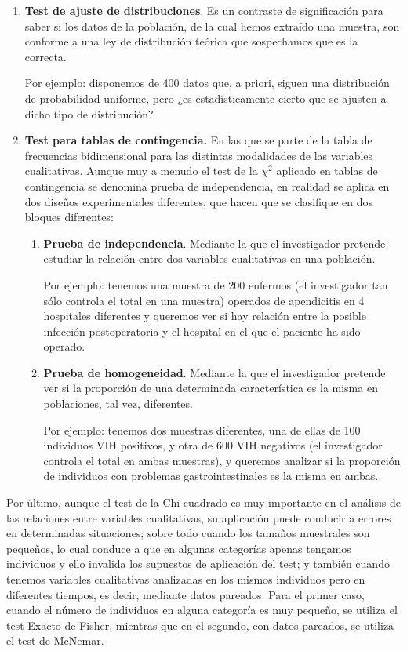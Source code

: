 \begin{enumerate}
\item \textbf{Test de ajuste de distribuciones}. Es un contraste
de significación para saber si los datos de la población, de la
cual hemos extraído una muestra, son conforme a una ley de
distribución teórica que sospechamos que es la correcta.

Por ejemplo: disponemos de 400 datos que, a priori, siguen una
distribución de probabilidad uniforme, pero ¿es estadísticamente
cierto que se ajusten a dicho tipo de distribución?


\item \textbf{Test para tablas de contingencia.} En las que se parte de la tabla de frecuencias bidimensional para las distintas modalidades de las variables cualitativas. Aunque muy a menudo el test de la
$\chi^{2}$ aplicado en tablas de contingencia se denomina prueba
de independencia, en realidad se aplica en dos diseños
experimentales diferentes, que hacen que se clasifique en dos
bloques diferentes:


\begin{enumerate}
\item \textbf{Prueba de independencia}. Mediante la que el
investigador pretende estudiar la relación entre dos variables cualitativas en una población.

Por ejemplo: tenemos una muestra de 200 enfermos (el investigador
tan sólo controla el total en una muestra) operados de apendicitis
en 4 hospitales diferentes y queremos ver si hay relación entre la
posible infección postoperatoria y el hospital en el que el paciente ha sido operado.

\item \textbf{Prueba de homogeneidad}. Mediante la que el
investigador pretende ver si la proporción de una determinada
característica es la misma en poblaciones, tal vez, diferentes.

Por ejemplo: tenemos dos muestras diferentes, una de ellas de 100
individuos VIH positivos, y otra de 600 VIH negativos (el
investigador controla el total en ambas muestras), y queremos
analizar si la proporción de individuos con problemas
gastrointestinales es la misma en ambas.
\end{enumerate}
\end{enumerate}

Por último, aunque el test de la Chi-cuadrado es muy importante en el análisis de las relaciones entre variables cualitativas, su aplicación puede conducir a errores en determinadas situaciones; sobre todo cuando los tamaños muestrales son pequeños, lo cual conduce a que en algunas categorías apenas tengamos individuos y ello invalida los supuestos de aplicación del test; y también cuando tenemos variables cualitativas analizadas en los mismos individuos pero en diferentes tiempos, es decir, mediante datos pareados. Para el primer caso, cuando el número de individuos en alguna categoría es muy pequeño, se utiliza el test Exacto de Fisher, mientras que en el segundo, con datos pareados, se utiliza el test de McNemar.


